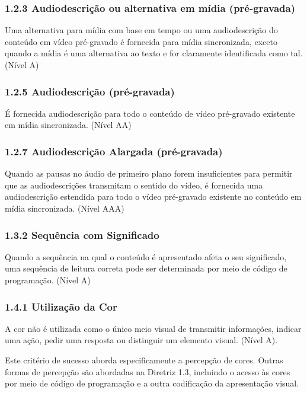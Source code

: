 \documentclass[a4paper]{article}
\begin{document}
\begin{titlepage}
\subsubsection{1.2.3 Audiodescrição ou alternativa em mídia (pré-gravada)}

Uma alternativa para mídia com base em tempo ou uma audiodescrição do conteúdo em vídeo pré-gravado é fornecida para mídia sincronizada, exceto quando a mídia é uma alternativa ao texto e for claramente identificada como tal. (Nível A)

\subsubsection{1.2.5 Audiodescrição (pré-gravada)}

É fornecida audiodescrição para todo o conteúdo de vídeo pré-gravado existente em mídia sincronizada. (Nível AA)

\subsubsection{1.2.7 Audiodescrição Alargada (pré-gravada)}

Quando as pausas no áudio de primeiro plano forem insuficientes para permitir que as audiodescrições transmitam o sentido do vídeo, é fornecida uma audiodescrição estendida para todo o vídeo pré-gravado existente no conteúdo em mídia sincronizada. (Nível AAA)

\subsubsection{1.3.2 Sequência com Significado}

Quando a sequência na qual o conteúdo é apresentado afeta o seu significado, uma sequência de leitura correta pode ser determinada por meio de código de programação. (Nível A)

\subsubsection{1.4.1 Utilização da Cor}

A cor não é utilizada como o único meio visual de transmitir informações, indicar uma ação, pedir uma resposta ou distinguir um elemento visual. (Nível A). 

Este critério de sucesso aborda especificamente a percepção de cores. Outras formas de percepção são abordadas na Diretriz 1.3, incluindo o acesso às cores por meio de código de programação e a outra codificação da apresentação visual.


\end{titlepage}
\end{document}
